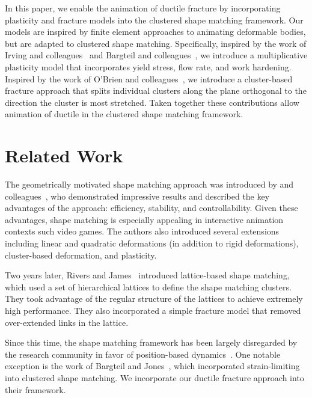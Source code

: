 \documentclass[review]{acmsiggraph}
\begin{document}
In this paper, we enable the animation of ductile fracture 
by incorporating plasticity and fracture models into the clustered shape matching framework.
Our models are inspired by finite element approaches to animating deformable bodies, but are adapted to 
clustered shape matching.
Specifically, inspired by the work of Irving and colleagues~ and Bargteil and 
colleagues~, we introduce a multiplicative plasticity model that incorporates
yield stress, flow rate, and work hardening.  Inspired by the work of O'Brien and colleagues~,
we introduce a cluster-based fracture approach that splits individual clusters along the plane orthogonal to the direction the 
cluster is most stretched.
Taken together these contributions allow animation of ductile in the clustered shape matching framework.

\section{Related Work}
The geometrically motivated shape matching approach was introduced by \Mueller and 
colleagues~, who demonstrated impressive results and 
described the key advantages of the approach: efficiency, stability, and controllability.
Given these advantages, shape matching is especially appealing in interactive animation contexts such 
video games.  The authors also introduced several extensions including linear and quadratic deformations 
(in addition to rigid deformations), cluster-based deformation, and plasticity.  

Two years later, Rivers and James~ introduced lattice-based shape matching,
which used a set of hierarchical lattices to define the shape matching clusters.  They took advantage
of the regular structure of the lattices to achieve extremely high performance.  They also incorporated a 
simple fracture model that removed over-extended links in the lattice.  

Since this time, the shape matching framework has been largely disregarded by the research community in favor of position-based
dynamics~\cite{Mueller:2007:PBD,Bender:2013:PBM,Bender:2014:ASO,Macklin:2014:UPP}.  One notable exception is
the work of Bargteil and Jones~, which incorporated strain-limiting into clustered shape matching.
We incorporate our ductile fracture approach into their framework.
\end{document}
